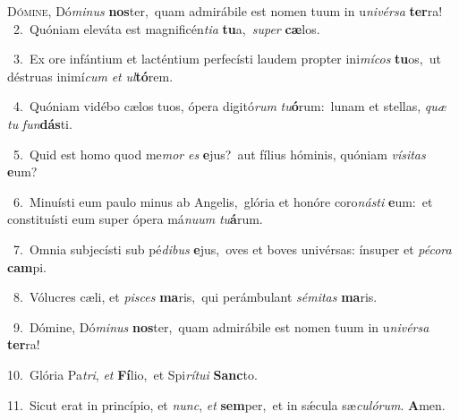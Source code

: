 \lettrine{\initial\textcolor{\initialcolor}{D}}{ómine,} Dó\-\textit{mi}\-\textit{nus} \textbf{nos}\-ter,~\star quam admirábile est nomen tuum in u\-\textit{ni}\-\textit{vér}\textit{sa} \textbf{ter}\-ra!\\
{\numbfont\textcolor{\numbcolor}{~2.}}~Quóniam eleváta est magnificén\-\textit{ti}\-\textit{a} \textbf{tu}\-a,~\star \textit{su}\-\textit{per} \textbf{cæ}\-los.\par
{\numbfont\textcolor{\numbcolor}{~3.}}~Ex ore infántium et lacténtium perfecísti laudem propter ini\-\textit{mí}\-\textit{cos} \textbf{tu}\-os,~\star ut déstruas inimí\textit{cum} \textit{et} \textit{ul}\-\textbf{tó}rem.\par
{\numbfont\textcolor{\numbcolor}{~4.}}~Quóniam vidébo cælos tuos, ópera digitó\textit{rum} \textit{tu}\-\textbf{ó}rum:~\star lunam et stellas, \textit{quæ} \textit{tu} \textit{fun}\-\textbf{dás}ti.\par
{\numbfont\textcolor{\numbcolor}{~5.}}~Quid est homo quod me\textit{mor} \textit{es} \textbf{e}\-jus?~\star aut fílius hóminis, quóniam \textit{ví}\-\textit{si}\textit{tas} \textbf{e}\-um?\par
{\numbfont\textcolor{\numbcolor}{~6.}}~Minuísti eum paulo minus ab Angelis,~\dagger glória et honóre coro\-\textit{nás}\-\textit{ti} \textbf{e}\-um:~\star et constituísti eum super ópera má\-\textit{nu}\-\textit{um} \textit{tu}\-\textbf{á}rum.\par
{\numbfont\textcolor{\numbcolor}{~7.}}~Omnia subjecísti sub pé\-\textit{di}\-\textit{bus} \textbf{e}\-jus,~\star oves et boves univérsas: ínsuper et \textit{pé}\-\textit{co}\textit{ra} \textbf{cam}\-pi.\par
{\numbfont\textcolor{\numbcolor}{~8.}}~Vólucres cæli, et \textit{pi}\-\textit{sces} \textbf{ma}\-ris,~\star qui perámbulant \textit{sé}\-\textit{mi}\textit{tas} \textbf{ma}\-ris.\par
{\numbfont\textcolor{\numbcolor}{~9.}}~Dómine, Dó\-\textit{mi}\-\textit{nus} \textbf{nos}\-ter,~\star quam admirábile est nomen tuum in u\-\textit{ni}\-\textit{vér}\textit{sa} \textbf{ter}\-ra!\par
{\numbfont\textcolor{\numbcolor}{10.}}~Glória Pa\-\textit{tri}\-, \textit{et} \textbf{Fí}\-lio,~\star et Spi\-\textit{rí}\-\textit{tu}\textit{i} \textbf{Sanc}\-to.\par
{\numbfont\textcolor{\numbcolor}{11.}}~Sicut erat in princípio, et \textit{nunc}\-, \textit{et} \textbf{sem}\-per,~\star et in sǽcula sæ\-\textit{cu}\-\textit{ló}\textit{rum}. \textbf{A}\-men.\par
